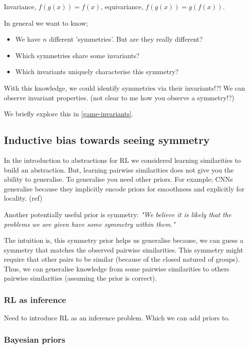 Invariance, $f(g(x)) = f(x)$, equivariance, $f(g(x)) = g(f(x))$.

In general we want to know;

\begin{itemize}
	\tightlist
	\item We have $n$ different 'symmetries'. But are they really different?
	\item Which symmetries share some invariants?
	\item Which invariants uniquely characterise this symmetry?
\end{itemize}

With this knowledge, we could identify symmetries via their invariants!?!
We can observe invariant properties. (not clear to me how you observe a symmetry!?)

We briefly explore this in \ref{game-invariants}.


\subsection{Inductive bias towards seeing symmetry}

In the introduction to abstractions for RL we considered learning similarities
to build an abstraction. But, learning pairwise similarities does not give
you the ability to generalise. To generalise you need other priors. For example;
CNNs generalise because they implicitly encode priors for smoothness and explicitly for locality. (ref)

Another potentially useful prior is symmetry: \textit{"We believe it is likely that
the problems we are given have some symmetry within them."}

The intuition is, this symmetry prior helps us generalise because, we can guess
a symmetry that matches the observed pairwise similarities. This symmetry might
require that other pairs to be similar (because of the closed natured of groups).
Thus, we can generalise knowledge from some pairwise similarities to others
pairwise similarities (assuming the prior is correct).

\subsubsection{RL as inference}

Need to introduce RL as an inference problem. Which we can add priors to.


\subsubsection{Bayesian priors}

